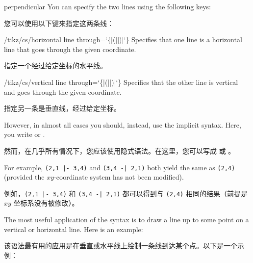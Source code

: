 \begin{coordinatesystem}{perpendicular}
    You can specify the two lines using the following keys:

    您可以使用以下键来指定这两条线：



    \begin{key}{/tikz/cs/horizontal line through={\ttfamily\char`\{}|(||)|{\ttfamily\char`\}}}
        Specifies that one line is a horizontal line that goes through the
        given coordinate.

        指定一个经过给定坐标的水平线。

    \end{key}
    \begin{key}{/tikz/cs/vertical line through={\ttfamily\char`\{}|(||)|{\ttfamily\char`\}}}
        Specifies that the other line is vertical and goes through the given
        coordinate.

        指定另一条是垂直线，经过给定坐标。

    \end{key}

    However, in almost all cases you should, instead, use the implicit syntax.
    Here, you write  or
    .

    然而，在几乎所有情况下，您应该使用隐式语法。在这里，您可以写成  或 。


    For example, \verb!(2,1 |- 3,4)! and  \verb!(3,4 -| 2,1)! both yield the
    same as \verb!(2,4)! (provided the $xy$-co\-or\-di\-nate system has not
    been modified).

    例如，\verb!(2,1 |- 3,4)! 和 \verb!(3,4 -| 2,1)! 都可以得到与 \verb!(2,4)! 相同的结果（前提是 $xy$ 坐标系没有被修改）。


    The most useful application of the syntax is to draw a line up to some
    point on a vertical or horizontal line. Here is an example:

    该语法最有用的应用是在垂直或水平线上绘制一条线到达某个点。以下是一个示例：

\begin{codeexample}[]
\end{codeexample}
\end{coordinatesystem}
